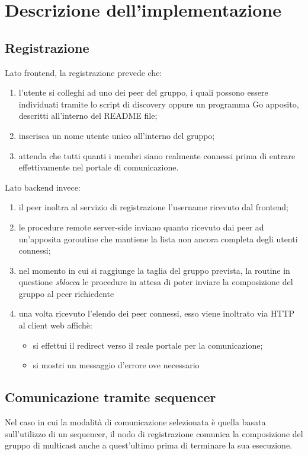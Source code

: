 \documentclass[conference]{IEEEtran}
\begin{document}
\section{Descrizione dell'implementazione}
\subsection{Registrazione}
Lato frontend, la registrazione prevede che:
\begin{enumerate}
\item l'utente si colleghi ad uno dei peer del gruppo, i quali possono essere individuati tramite lo script di discovery oppure un programma Go apposito, descritti all'interno del README file;
\item inserisca un nome utente unico all'interno del gruppo;
\item attenda che tutti quanti i membri siano realmente connessi prima di entrare effettivamente nel portale di comunicazione.
\end{enumerate}

Lato backend invece:
\begin{enumerate}
\item il peer inoltra al servizio di registrazione l'username ricevuto dal frontend;
\item le procedure remote server-side inviano quanto ricevuto dai peer ad un'apposita goroutine che mantiene la lista non ancora completa degli utenti connessi;
\item nel momento in cui si raggiunge la taglia del gruppo prevista, la routine in questione \textit{sblocca} le procedure in attesa di poter inviare la composizione del gruppo al peer richiedente
\item una volta ricevuto l'elendo dei peer connessi, esso viene inoltrato via HTTP al client web affichè:
\begin{itemize}
\item si effettui il redirect verso il reale portale per la comunicazione;
\item si mostri un messaggio d'errore ove necessario
\end{itemize}
\end{enumerate}

\subsection{Comunicazione tramite sequencer}
Nel caso in cui la modalità di comunicazione selezionata è quella basata sull'utilizzo di un sequencer, il nodo di registrazione comunica la composizione del gruppo di multicast anche a quest'ultimo prima di terminare la sua esecuzione.
\end{document}
